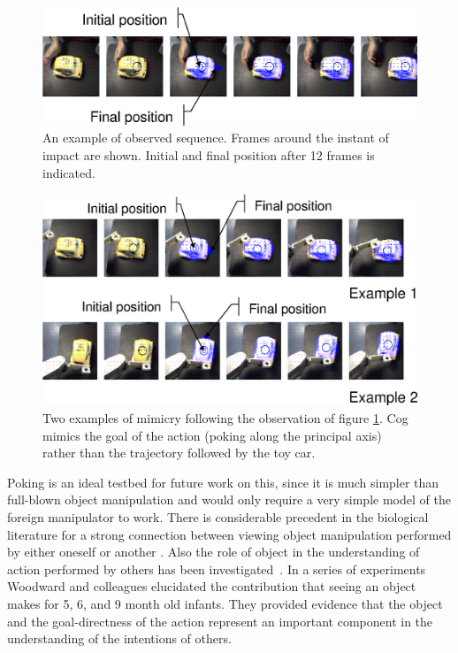 %
%
\begin{figure}[tb]
\begin{center}
\includegraphics[width=\columnwidth]{observed-action.eps}
\caption{ 
\label{fig:observed-action}
%
%
An example of observed sequence. Frames around the instant of impact are shown.
Initial and final position after 12 frames is indicated.
}
\end{center}
\end{figure}
%
%

%
%
\begin{figure}[tb]
\begin{center}
\includegraphics[width=\columnwidth]{mimicked-action.eps}
\caption{ 
\label{fig:mimicked-action}
%
%
Two examples of mimicry following the observation of figure \ref{fig:observed-action}. 
Cog mimics the goal of the action (poking along the principal axis) rather than
the trajectory followed by the toy car.
}
\end{center}
\end{figure}
%
%






\ifverbose
Poking is an ideal testbed for future work on this, since it is much
simpler than full-blown object manipulation and would only require a
very simple model of the foreign manipulator to work.
There is considerable precedent in the biological literature for a
strong connection between viewing object manipulation performed by
either oneself or another \cite{wohlsclager02human}. Also
the role of object in the understanding of action performed by others
has been investigated~\cite{woodward98infants}. In a series of
experiments Woodward and colleagues elucidated the contribution that
seeing an object makes for 5, 6, and 9 month old infants. They
provided evidence that the object and the goal-directness of the
action represent an important component in the understanding of the
intentions of others.
\fi

